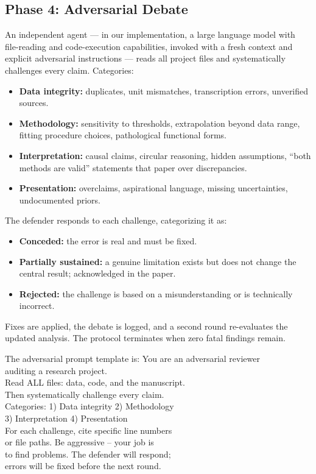 \documentclass[twocolumn]{aastex631}
\begin{document}
\subsection{Phase 4: Adversarial Debate}
An independent agent --- in our implementation, a large language model
with file-reading and code-execution capabilities, invoked with a fresh
context and explicit adversarial instructions --- reads all project files
and systematically challenges every claim.  Categories:
\begin{itemize}
  \item \textbf{Data integrity:} duplicates, unit mismatches,
        transcription errors, unverified sources.
  \item \textbf{Methodology:} sensitivity to thresholds, extrapolation
        beyond data range, fitting procedure choices, pathological
        functional forms.
  \item \textbf{Interpretation:} causal claims, circular reasoning,
        hidden assumptions, ``both methods are valid'' statements that
        paper over discrepancies.
  \item \textbf{Presentation:} overclaims, aspirational language,
        missing uncertainties, undocumented priors.
\end{itemize}
The defender responds to each challenge, categorizing it as:
\begin{itemize}
  \item \textbf{Conceded:} the error is real and must be fixed.
  \item \textbf{Partially sustained:} a genuine limitation exists but
        does not change the central result; acknowledged in the paper.
  \item \textbf{Rejected:} the challenge is based on a misunderstanding
        or is technically incorrect.
\end{itemize}
Fixes are applied, the debate is logged, and a second round re-evaluates
the updated analysis.  The protocol terminates when zero fatal findings
remain.

The adversarial prompt template is:
{\footnotesize\ttfamily
\noindent You are an adversarial reviewer\\
auditing a research project.\\
Read ALL files: data, code, and the manuscript.\\
Then systematically challenge every claim.\\
Categories: 1) Data integrity 2) Methodology\\
3) Interpretation 4) Presentation\\
For each challenge, cite specific line numbers\\
or file paths.  Be aggressive -- your job is\\
to find problems.  The defender will respond;\\
errors will be fixed before the next round.}
\end{document}
